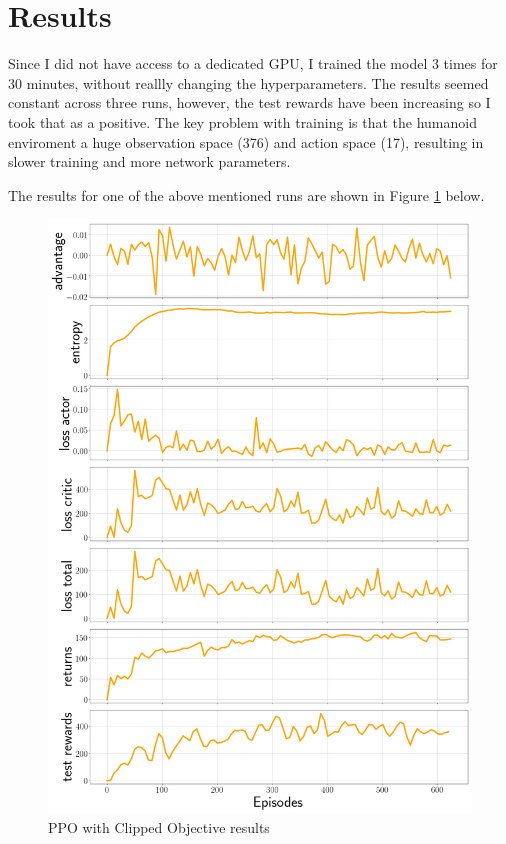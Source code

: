 \documentclass[12pt,a4paper]{article}
\begin{document}
\section{Results}\label{results}

Since I did not have access to a dedicated GPU, I trained the model 3 times for 30 minutes, without reallly changing the hyperparameters. The results seemed constant across three runs, however, the test rewards have been increasing so I took that as a positive. The key problem with training is that the humanoid enviroment a huge observation space (376) and action space (17), resulting in slower training and more network parameters.

The results  for one of the above mentioned runs are shown in Figure \ref{img:ppo_clipped} below.

\begin{figure}[H]
\begin{center}
\includegraphics[width=\columnwidth, angle = 0]{img/results.png}
\end{center}
\caption{PPO with Clipped Objective  results \cite{berkley} }
\label{img:ppo_clipped}
\end{figure}
\end{document}
